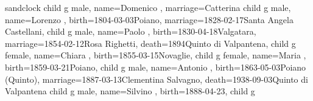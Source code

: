 \documentclass{article}
\begin{document}
\begin{midpage}
\begin{center}

\begin{genealogypicture}[
    processing=database,
    database format=full,
    node size=3.8cm,
    level size=2.8cm,
    level distance=6mm,
    list separators hang=3mm,
    name font=\bfseries,
    surn code={\textcolor{black!50!black}{#1}},
    place text={\newline}{},
    date format=d month yyyy,
    tcbset={male/.style={colframe=blue,colback=blue!5},
    female/.style={colframe=red,colback=red!5}},
    box={fit basedim=7pt,boxsep=2pt,segmentation style=solid,
        halign=left,before upper=\parskip1pt,
        \gtrDBsex,
    },
]
sandclock
{
    child{
        g{
            male,
            name={Domenico },
            marriage={}{Catterina}
        }
        child{
            g{
                male,
                name={Lorenzo },
                birth={1804-03-03}{Poiano},
                marriage={1828-02-17}{Santa Angela Castellani},
            }
            child{
                g{
                    male,
                    name={Paolo },
                    birth={1830-04-18}{Valgatara},
                    marriage={1854-02-12}{Rosa Righetti},
                    death={1894}{Quinto di Valpantena},
                }
                child{
                    g{
                        female,
                        name={Chiara },
                        birth={1855-03-15}{Novaglie},
                    }
                }
                child{
                    g{
                        female,
                        name={Maria },
                        birth={1859-03-21}{Poiano},
                    }
                }
                child{
                    g{
                        male,
                        name={Antonio },
                        birth={1863-05-03}{Poiano (Quinto)},
                        marriage={1887-03-13}{Clementina Salvagno},
                        death={1938-09-03}{Quinto di Valpantena}
                    }
                    child{
                        g{
                            male,
                            name={Silvino },
                            birth={1888-04-23}{},
                        }
                    }
                    child{
                        g{
}}}}}}}
\end{genealogypicture}
\end{center}
\end{midpage}
\end{document}
